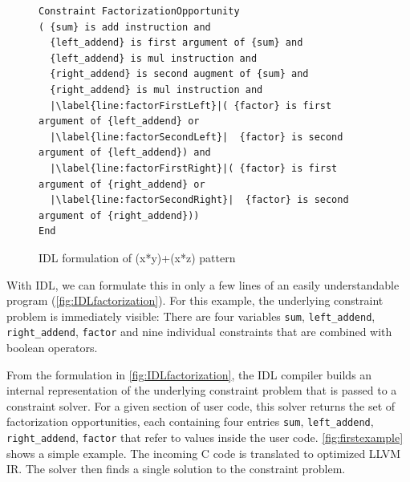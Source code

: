 \begin{figure}[t]
\begin{lstlisting}[language={constraints},escapechar=|,basicstyle=\linespread{1.133}\scriptsize\ttfamily]
Constraint FactorizationOpportunity
( {sum} is add instruction and
  {left_addend} is first argument of {sum} and
  {left_addend} is mul instruction and
  {right_addend} is second augment of {sum} and
  {right_addend} is mul instruction and
  |\label{line:factorFirstLeft}|( {factor} is first argument of {left_addend} or
  |\label{line:factorSecondLeft}|  {factor} is second argument of {left_addend}) and
  |\label{line:factorFirstRight}|( {factor} is first argument of {right_addend} or
  |\label{line:factorSecondRight}|  {factor} is second argument of {right_addend}))
End
\end{lstlisting}
\vspace{-0.3cm}
\caption{IDL formulation of (x*y)+(x*z) pattern}
\label{fig:IDLfactorization}
\end{figure}

    With IDL, we can formulate this in only a few lines of an easily
    understandable program (\autoref{fig:IDLfactorization}).
    For this example, the underlying constraint problem is immediately visible:
    There are four variables \texttt{sum}, \texttt{left\_addend},
    \texttt{right\_addend}, \texttt{factor} and nine individual constraints
    that are combined with boolean operators.

    From the formulation in \autoref{fig:IDLfactorization}, the IDL compiler
    builds an internal representation of the underlying constraint problem that
    is passed to a constraint solver.
    For a given section of user code, this solver returns the set of
    factorization opportunities, each containing four entries
    \texttt{sum}, \texttt{left\_addend}, \texttt{right\_addend}, \texttt{factor}
    that refer to values inside the user code.
    \autoref{fig:firstexample} shows a simple example.
    The incoming C code is translated to optimized LLVM IR.
    The solver then finds a single solution to the constraint problem.

